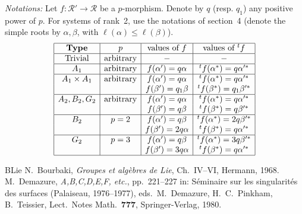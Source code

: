 \emph{Notations:} Let $f:\mathcal R'\to\mathcal R$ be a $p$-morphism. Denote by $q$ (resp. $q_1$) any positive power of $p$. For systems of rank~2, use the notations of section~4 (denote the simple roots by $\alpha,\beta$, with $\ell(\alpha)\leq\ell(\beta)$).
\[
\begin{array}{|c|c|c|c|}\hline
\textbf{Type}&p&\text{values of }f&\text{values of }{}^tf\\\hline
\text{Trivial}&\text{arbitrary}&-&-\\\hline
A_1&\text{arbitrary}&f(\alpha')=q\alpha&{}^tf(\alpha^*)=q\alpha'^*\\\hline
A_1\times A_1&\text{arbitrary}&f(\alpha')=q\alpha&{}^tf(\alpha^*)=q\alpha'^*\\
&&f(\beta')=q_1\beta&{}^tf(\beta^*)=q_1\beta'^*\\\hline
A_2,B_2,G_2&\text{arbitrary}&f(\alpha')=q\alpha&{}^tf(\alpha^*)=q\alpha'^*\\
&&f(\beta')=q\beta&{}^tf(\beta^*)=q\beta'^*\\\hline
B_2&p=2&f(\alpha')=q\beta&{}^tf(\alpha^*)=2q\beta'^*\\
&&f(\beta')=2q\alpha&{}^tf(\beta^*)=q\alpha'^*\\\hline
G_2&p=3&f(\alpha')=q\beta&{}^tf(\alpha^*)=3q\beta'^*\\
&&f(\beta')=3q\alpha&{}^tf(\beta^*)=q\alpha'^*\\\hline
\end{array}
\]

\begin{thebibliography}{BLie}
 N.~Bourbaki, \textit{Groupes et alg\`ebres de Lie}, Ch.~IV--VI, Hermann, 1968.
 M.~Demazure, \textit{A,B,C,D,E,F, etc.}, pp.~221--227 in: S\'eminaire sur les singularit\'es des surfaces (Palaiseau, 1976--1977), eds.~M.~Demazure, H.~C.~Pinkham, B.~Teissier, Lect.~Notes Math.~\textbf{777}, Springer-Verlag, 1980.
\end{thebibliography}
